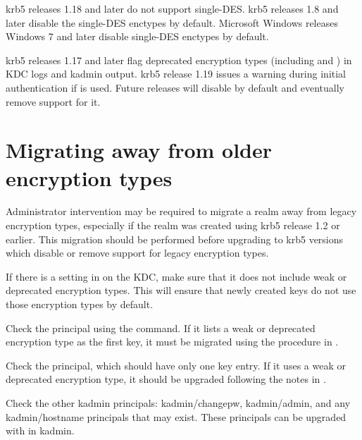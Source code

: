 \documentclass[letterpaper,10pt,english]{sphinxmanual}
\begin{document}
krb5 releases 1.18 and later do not support single-DES.  krb5 releases
1.8 and later disable the single-DES enctypes by default.  Microsoft
Windows releases Windows 7 and later disable single-DES enctypes by
default.

krb5 releases 1.17 and later flag deprecated encryption types
(including  and ) in KDC logs and
kadmin output.  krb5 release 1.19 issues a warning during initial
authentication if  is used.  Future releases will
disable  by default and eventually remove support for
it.


\section{Migrating away from older encryption types}
\label{\detokenize{admin/enctypes:migrating-away-from-older-encryption-types}}
Administrator intervention may be required to migrate a realm away
from legacy encryption types, especially if the realm was created
using krb5 release 1.2 or earlier.  This migration should be performed
before upgrading to krb5 versions which disable or remove support for
legacy encryption types.

If there is a  setting in {\hyperref[\detokenize{admin/conf_files/kdc_conf:kdc-conf-5}]{}} on
the KDC, make sure that it does not include weak or deprecated
encryption types.  This will ensure that newly created keys do not use
those encryption types by default.

Check the  principal using the {\hyperref[\detokenize{admin/admin_commands/kadmin_local:kadmin-1}]{}}
 command.  If it lists a weak or deprecated encryption
type as the first key, it must be migrated using the procedure in
{\hyperref[\detokenize{admin/database:changing-krbtgt-key}]{}}.

Check the  principal, which should have only one key
entry.  If it uses a weak or deprecated encryption type, it should be
upgraded following the notes in {\hyperref[\detokenize{admin/database:updating-history-key}]{}}.

Check the other kadmin principals: kadmin/changepw, kadmin/admin, and
any kadmin/hostname principals that may exist.  These principals can
be upgraded with  in kadmin.
\end{document}
